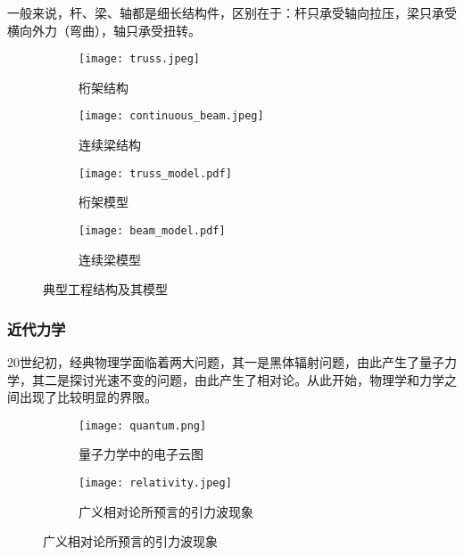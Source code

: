 \begin{marginpartext}
        一般来说，杆、梁、轴都是细长结构件，区别在于：杆只承受轴向拉压，梁只承受横向外力（弯曲），轴只承受扭转。
\end{marginpartext}

\begin{figure}[ht]
    \centering
    \begin{subfigure}[t]{0.3\textwidth} \centering
        \texttt{[image: truss.jpeg]}
        \caption{桁架结构}
    \end{subfigure}\quad
    \begin{subfigure}[t]{0.6\textwidth} \centering
        \texttt{[image: continuous\_beam.jpeg]}
        \caption{连续梁结构}
    \end{subfigure}\bigskip

    \begin{subfigure}[t]{0.8\textwidth} \centering
        \texttt{[image: truss\_model.pdf]}
        \caption{桁架模型}
    \end{subfigure}\bigskip

    \begin{subfigure}[t]{0.6\textwidth} \centering
        \texttt{[image: beam\_model.pdf]}
        \caption{连续梁模型}
    \end{subfigure}
    \caption{典型工程结构及其模型}
\end{figure}

\subsubsection{近代力学}

20世纪初，经典物理学面临着两大问题，其一是黑体辐射问题，由此产生了量子力学，其二是探讨光速不变的问题，由此产生了相对论。从此开始，物理学和力学之间出现了比较明显的界限。

\begin{figure}[ht]
    \centering
    \begin{subfigure}[t]{0.45\textwidth} \centering
        \texttt{[image: quantum.png]}
        \caption{量子力学中的电子云图}
    \end{subfigure}\quad
    \begin{subfigure}[t]{0.45\textwidth} \centering
        \texttt{[image: relativity.jpeg]}
        \caption{广义相对论所预言的引力波现象}
    \end{subfigure}
\end{figure}

